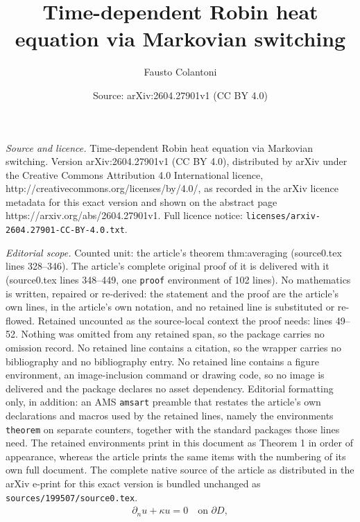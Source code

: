 \documentclass[10pt,a4paper]{amsart}
\title{Time-dependent Robin heat equation via Markovian switching}
\author{Fausto Colantoni}
\date{Source: arXiv:2604.27901v1 (CC BY 4.0)}
\begin{document}
\maketitle

\noindent\emph{Source and licence.} Time-dependent Robin heat equation via Markovian switching. Version arXiv:2604.27901v1 (CC BY 4.0), distributed by arXiv under the Creative Commons Attribution 4.0 International licence, http://creativecommons.org/licenses/by/4.0/, as recorded in the arXiv licence metadata for this exact version and shown on the abstract page https://arxiv.org/abs/2604.27901v1. Full licence notice: \texttt{licenses/arxiv-2604.27901-CC-BY-4.0.txt}.\par\smallskip

\noindent\textit{Editorial scope.} Counted unit: the article's theorem thm:averaging (source0.tex lines 328--346). The article's complete original proof of it is delivered with it (source0.tex lines 348--449, one \texttt{proof} environment of 102 lines). No mathematics is written, repaired or re-derived: the statement and the proof are the article's own lines, in the article's own notation, and no retained line is substituted or re-flowed.  Retained uncounted as the source-local context the proof needs: lines 49--52.  Nothing was omitted from any retained span, so the package carries no omission record.  No retained line contains a citation, so the wrapper carries no bibliography and no bibliography entry.  No retained line contains a figure environment, an image-inclusion command or drawing code, so no image is delivered and the package declares no asset dependency.  Editorial formatting only, in addition: an AMS \texttt{amsart} preamble that restates the article's own declarations and macros used by the retained lines, namely the environments \texttt{theorem} on separate counters, together with the standard packages those lines need.  The retained environments print in this document as Theorem 1 in order of appearance, whereas the article prints the same items with the numbering of its own full document.  The complete native source of the article as distributed in the arXiv e-print for this exact version is bundled unchanged as \texttt{sources/199507/source0.tex}.
\begin{align}
	\label{robin:bc}
	\partial_n u + \kappa u = 0\quad\text{on }\partial D,
\end{align}
\end{document}
